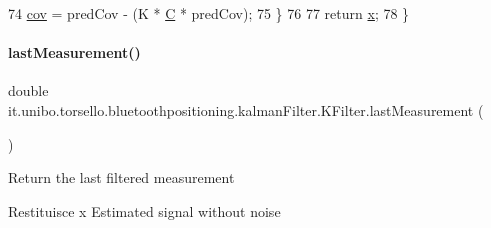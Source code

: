 \begin{DoxyCode}
74             \hyperlink{classit_1_1unibo_1_1torsello_1_1bluetoothpositioning_1_1kalmanFilter_1_1KFilter_a2c0a42b4dbe4de0e2a34046b9dc8eb3b_a2c0a42b4dbe4de0e2a34046b9dc8eb3b}{cov} = predCov - (K * \hyperlink{classit_1_1unibo_1_1torsello_1_1bluetoothpositioning_1_1kalmanFilter_1_1KFilter_a850cd09cf3a3a8ee28e16636069cb9a0_a850cd09cf3a3a8ee28e16636069cb9a0}{C} * predCov);
75         \}
76 
77         \textcolor{keywordflow}{return} \hyperlink{classit_1_1unibo_1_1torsello_1_1bluetoothpositioning_1_1kalmanFilter_1_1KFilter_aa6f9d5594f6870767679dbb79e40918d_aa6f9d5594f6870767679dbb79e40918d}{x};
78     \}
\end{DoxyCode}
\hypertarget{classit_1_1unibo_1_1torsello_1_1bluetoothpositioning_1_1kalmanFilter_1_1KFilter_aa2eb3f57a84ca002ceb97a0d7c9f9eed_aa2eb3f57a84ca002ceb97a0d7c9f9eed}{}\label{classit_1_1unibo_1_1torsello_1_1bluetoothpositioning_1_1kalmanFilter_1_1KFilter_aa2eb3f57a84ca002ceb97a0d7c9f9eed_aa2eb3f57a84ca002ceb97a0d7c9f9eed} 
\paragraph{\texorpdfstring{last\+Measurement()}{lastMeasurement()}}
{\footnotesize\ttfamily double it.\+unibo.\+torsello.\+bluetoothpositioning.\+kalman\+Filter.\+K\+Filter.\+last\+Measurement (\begin{DoxyParamCaption}{ }\end{DoxyParamCaption})\hspace{0.3cm}{\ttfamily [private]}}

Return the last filtered measurement

\begin{DoxyReturn}{Restituisce}
x Estimated signal without noise 
\end{DoxyReturn}

